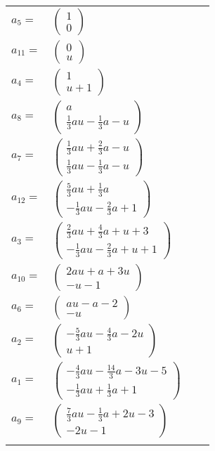 \documentclass[1p]{elsarticle_modified}
\theoremstyle{definition}
\begin{document}
\begin{tabular}{m{7pt} m{180pt} m{7pt} m{180pt} }
\flushright $a_{5}=$&$\begin{pmatrix}1\\0\end{pmatrix}$ \\
\flushright $a_{11}=$&$\begin{pmatrix}0\\u\end{pmatrix}$ \\
\flushright $a_{4}=$&$\begin{pmatrix}1\\u+1\end{pmatrix}$ \\
\flushright $a_{8}=$&$\begin{pmatrix}a\\\frac{1}{3} a u-\frac{1}{3} a- u\end{pmatrix}$ \\
\flushright $a_{7}=$&$\begin{pmatrix}\frac{1}{3} a u+\frac{2}{3} a- u\\\frac{1}{3} a u-\frac{1}{3} a- u\end{pmatrix}$ \\
\flushright $a_{12}=$&$\begin{pmatrix}\frac{5}{3} a u+\frac{1}{3} a\\-\frac{1}{3} a u-\frac{2}{3} a+1\end{pmatrix}$ \\
\flushright $a_{3}=$&$\begin{pmatrix}\frac{2}{3} a u+\frac{4}{3} a+u+3\\-\frac{1}{3} a u-\frac{2}{3} a+u+1\end{pmatrix}$ \\
\flushright $a_{10}=$&$\begin{pmatrix}2 a u+a+3 u\\- u-1\end{pmatrix}$ \\
\flushright $a_{6}=$&$\begin{pmatrix}a u- a-2\\- u\end{pmatrix}$ \\
\flushright $a_{2}=$&$\begin{pmatrix}-\frac{5}{3} a u-\frac{4}{3} a-2 u\\u+1\end{pmatrix}$ \\
\flushright $a_{1}=$&$\begin{pmatrix}-\frac{4}{3} a u-\frac{14}{3} a-3 u-5\\-\frac{1}{3} a u+\frac{1}{3} a+1\end{pmatrix}$ \\
\flushright $a_{9}=$&$\begin{pmatrix}\frac{7}{3} a u-\frac{1}{3} a+2 u-3\\-2 u-1\end{pmatrix}$\\&\end{tabular}
\end{document}
